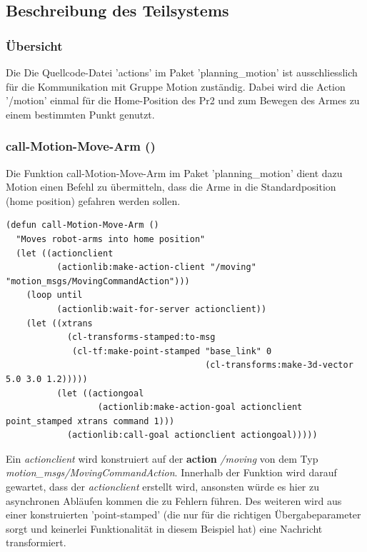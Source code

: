 \documentclass{suturo}
\begin{document}
\subsection{Beschreibung des Teilsystems}
\subsubsection{\"Ubersicht}
Die Die Quellcode-Datei 'actions' im Paket 'planning\_motion'  ist ausschliesslich für die Kommunikation mit Gruppe Motion zuständig. Dabei wird die Action '/motion' einmal für die Home-Position des Pr2 und zum Bewegen des Armes zu einem bestimmten Punkt genutzt.


\subsubsection{call-Motion-Move-Arm ()}

Die Funktion call-Motion-Move-Arm im Paket 'planning\_motion' dient dazu Motion einen Befehl zu übermitteln, dass die Arme in die Standardposition (home position) gefahren werden sollen.


\noindent
\begin{minipage}{\linewidth}
\begin{lstlisting}
(defun call-Motion-Move-Arm ()
  "Moves robot-arms into home position"
  (let ((actionclient 
          (actionlib:make-action-client "/moving" "motion_msgs/MovingCommandAction")))
    (loop until
          (actionlib:wait-for-server actionclient))
    (let ((xtrans
            (cl-transforms-stamped:to-msg
             (cl-tf:make-point-stamped "base_link" 0 
                                       (cl-transforms:make-3d-vector 5.0 3.0 1.2)))))
          (let ((actiongoal 
                  (actionlib:make-action-goal actionclient point_stamped xtrans command 1)))
            (actionlib:call-goal actionclient actiongoal)))))
\end{lstlisting}
\end{minipage}

Ein \textit{actionclient} wird konstruiert auf der \textbf{action} \textit{/moving} von dem Typ \\
 \textit{motion\_msgs/MovingCommandAction}. Innerhalb der Funktion wird darauf gewartet, dass der \textit{actionclient} erstellt wird, ansonsten würde es hier zu asynchronen Abläufen kommen die zu Fehlern führen. 
Des weiteren wird aus einer konstruierten 'point-stamped' (die nur für die richtigen Übergabeparameter sorgt und keinerlei Funktionalität in diesem Beispiel hat) eine Nachricht transformiert. \\
\end{document}
